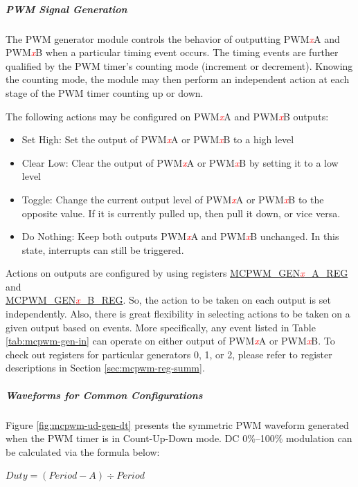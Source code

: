\documentclass[main\_\_EN.tex]{subfiles}
\begin{document}
\subparagraph{PWM Signal Generation}
The PWM generator module controls the behavior of outputting PWM\textcolor{red}{\it{x}}A and PWM\textcolor{red}{\it{x}}B when a particular timing event occurs. The timing events are further qualified by the PWM timer's counting mode (increment or decrement). Knowing the counting mode, the module may then perform an independent action at each stage of the PWM timer counting up or down. 

The following actions may be configured on PWM\textcolor{red}{\it{x}}A and PWM\textcolor{red}{\it{x}}B outputs: 
\begin{itemize}
    \item Set High: Set the output of PWM\textcolor{red}{\it{x}}A or PWM\textcolor{red}{\it{x}}B to a high level
    \item Clear Low: Clear the output of PWM\textcolor{red}{\it{x}}A or PWM\textcolor{red}{\it{x}}B by setting it to a low level
    \item Toggle: Change the current output level of PWM\textcolor{red}{\it{x}}A or PWM\textcolor{red}{\it{x}}B to the opposite value. If it is currently pulled up, then pull it down, or vice versa. 
    \item Do Nothing: Keep both outputs PWM\textcolor{red}{\it{x}}A and PWM\textcolor{red}{\it{x}}B unchanged. In this state, interrupts can still be triggered.
\end{itemize}

Actions on outputs are configured by using registers \hyperref[regdesc:MCPWMGEN0AREG]{MCPWM\_GEN\textcolor{red}{\it{x}}\_A\_REG} and \\\hyperref[regdesc:MCPWMGEN0BREG]{MCPWM\_GEN\textcolor{red}{\it{x}}\_B\_REG}. So, the action to be taken on each output is set independently. Also, there is great flexibility in selecting actions to be taken on a given output based on events. More specifically, any event listed in Table \ref{tab:mcpwm-gen-in} can operate on either output of PWM\textcolor{red}{\it{x}}A or PWM\textcolor{red}{\it{x}}B. To check out registers for particular generators 0, 1, or 2, please refer to register descriptions in Section \ref{sec:mcpwm-reg-summ}.

\subparagraph{Waveforms for Common Configurations}
Figure \ref{fig:mcpwm-ud-gen-dt} presents the symmetric PWM waveform generated when the PWM timer is in Count-Up-Down mode. DC 0\%–100\% modulation can be calculated via the formula below:

\begin{center}
$Duty =  (Period - A) \div Period$
\end{center}
\end{document}

